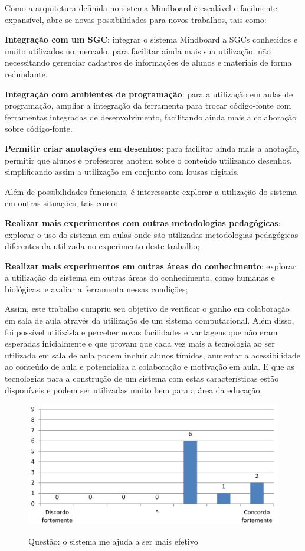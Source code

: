 Como a arquitetura definida no sistema Mindboard é escalável e facilmente expansível, abre-se novas possibilidades para novos trabalhos, tais como:

\textbf{Integração com um SGC}: integrar o sistema Mindboard a SGCs conhecidos e muito utilizados no mercado, para facilitar ainda mais sua utilização, não necessitando gerenciar cadastros de informações de alunos e materiais de forma redundante.

\textbf{Integração com ambientes de programação}: para a utilização em aulas de programação, ampliar a integração da ferramenta para trocar código-fonte com ferramentas integradas de desenvolvimento, facilitando ainda mais a colaboração sobre código-fonte.

\textbf{Permitir criar anotações em desenhos}: para facilitar ainda mais a anotação, permitir que alunos e professores anotem sobre o conteúdo utilizando desenhos, simplificando assim a utilização em conjunto com lousas digitais.

Além de possibilidades funcionais, é interessante explorar a utilização do sistema em outras situações, tais como:

\textbf{Realizar mais experimentos com outras metodologias pedagógicas}: explorar o uso do sistema em aulas onde são utilizadas metodologias pedagógicas diferentes da utilizada no experimento deste trabalho;

\textbf{Realizar mais experimentos em outras áreas do conhecimento}: explorar a utilização do sistema em outras áreas do conhecimento, como humanas e biológicas, e avaliar a ferramenta nessas condições;

Assim, este trabalho cumpriu seu objetivo de verificar o ganho em colaboração em sala de aula através da utilização de um sistema computacional. Além disso, foi possível utilizá-la e perceber novas facilidades e vantagens que não eram esperadas inicialmente e que provam que cada vez mais a tecnologia ao ser utilizada em sala de aula podem incluir alunos tímidos, aumentar a acessibilidade ao conteúdo de aula e potencializa a colaboração e motivação em aula. E que as tecnologias para a construção de um sistema com estas características estão disponíveis e podem ser utilizadas muito bem para a área da educação.


\iffalse
\begin{figure}[ht]
\centering
\caption{Questão: o sistema me ajuda a ser mais efetivo}
\includegraphics[width=1.0\textwidth]{use/mais_efetivo.pdf} 
\label{fig:mais_efetivo} 
\end{figure}


